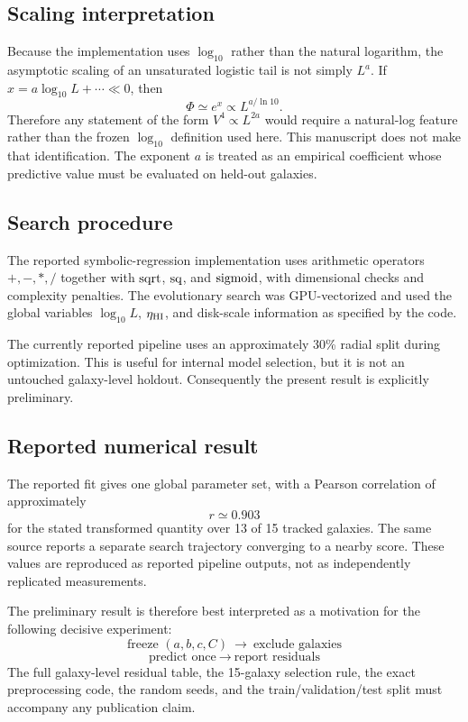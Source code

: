 \documentclass[twocolumn]{aastex631}
\begin{document}
\subsection{Scaling interpretation}
Because the implementation uses $\log_{10}$ rather than the natural logarithm, the asymptotic scaling of an unsaturated logistic tail is not simply $L^{a}$. If $x=a\log_{10}L+\cdots\ll0$, then
\[
\Phi\simeq e^x\propto L^{a/\ln10}.
\]
Therefore any statement of the form $V^4\propto L^{2a}$ would require a natural-log feature rather than the frozen $\log_{10}$ definition used here. This manuscript does not make that identification. The exponent $a$ is treated as an empirical coefficient whose predictive value must be evaluated on held-out galaxies.

\subsection{Search procedure}
The reported symbolic-regression implementation uses arithmetic operators $+,-,*,/$ together with ${\rm sqrt}$, ${\rm sq}$, and ${\rm sigmoid}$, with dimensional checks and complexity penalties. The evolutionary search was GPU-vectorized and used the global variables $\log_{10}L$, $\eta_{\rm HI}$, and disk-scale information as specified by the code.

The currently reported pipeline uses an approximately 30\% radial split during optimization. This is useful for internal model selection, but it is not an untouched galaxy-level holdout. Consequently the present result is explicitly preliminary.

\subsection{Reported numerical result}
The reported fit gives one global parameter set, with a Pearson correlation of approximately
\[
r\simeq0.903
\]
for the stated transformed quantity over 13 of 15 tracked galaxies. The same source reports a separate search trajectory converging to a nearby score. These values are reproduced as reported pipeline outputs, not as independently replicated measurements.

The preliminary result is therefore best interpreted as a motivation for the following decisive experiment:
\begin{equation}
\boxed{\text{freeze }(a,b,c,C)\ \rightarrow\ \text{exclude galaxies}}
\end{equation}
\begin{equation}
\boxed{\text{predict once}\ \rightarrow\ \text{report residuals}}
\end{equation}
The full galaxy-level residual table, the 15-galaxy selection rule, the exact preprocessing code, the random seeds, and the train/validation/test split must accompany any publication claim.
\end{document}
